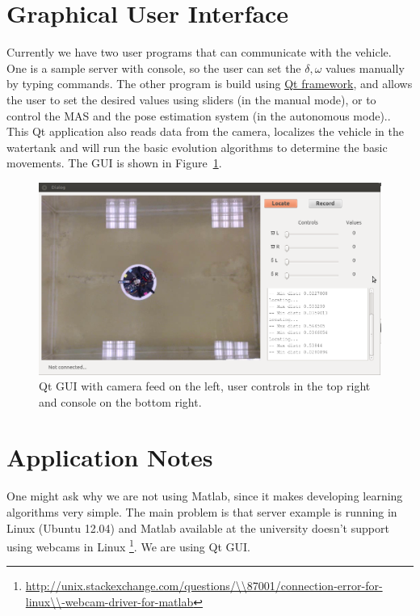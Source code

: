 \begin{appendix}
\section{Graphical User Interface}
Currently we have two user programs that can communicate with the vehicle. One is a sample server with console, so the user can set the $\delta, \omega$ values manually by typing commands. The other program is build using \href{http://www.qt.io/}{Qt framework}, and allows the user to set the desired values using sliders (in the manual mode), or to control the MAS and the pose estimation system (in the autonomous mode).. This Qt application also reads data from the camera, localizes the vehicle in the watertank and will run the basic evolution algorithms to determine the basic movements. The GUI is shown in Figure~\ref{fig-gui}.

\begin{figure}
\centering
\includegraphics[width=13.5cm]{Files/Figures/gui.png}
\caption[Qt GUI with camera feed]{Qt GUI with camera feed on the left, user controls in the top right and console on the bottom right.}
\label{fig-gui}
\end{figure}

\section{Application Notes}
One might ask why we are not using Matlab, since it makes developing learning algorithms very simple. The main problem is that server example is running in Linux (Ubuntu 12.04) and Matlab available at the university doesn't support using webcams in Linux \footnote{\url{http://unix.stackexchange.com/questions/\\87001/connection-error-for-linux\\-webcam-driver-for-matlab}}. We are using Qt GUI.



\end{appendix}
